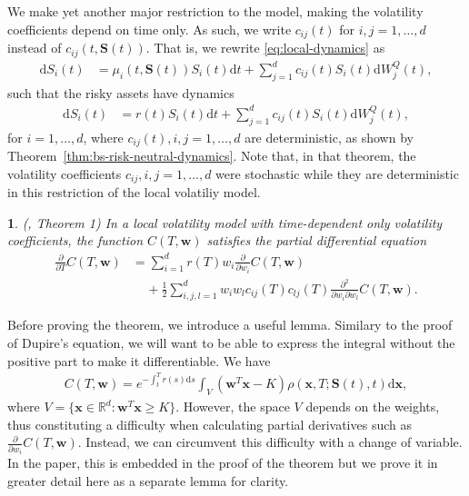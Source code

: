\documentclass[english]{article}
\numberwithin{equation}{section}
\numberwithin{figure}{section}
\theoremstyle{bolddescit}
\newtheorem{theorem}{\protect\theoremname}[section]
\theoremstyle{definition}
\theoremstyle{definition}
\theoremstyle{plain}
\theoremstyle{plain}
\theoremstyle{bolddesc}
\theoremstyle{plain}
\theoremstyle{remark}
\providecommand{\theoremname}{Theorem}
\begin{document}
We make yet another major restriction to the model, making the volatility coefficients depend on time only. As such, we write $c_{ij}(t)$ for $i,j=1,\ldots,d$ instead of $c_{ij}(t,\mathbf{S}(t))$. That is, we rewrite \eqref{eq:local-dynamics} as
\begin{align*}
  \mathrm{d}S_i(t) &= \mu_i(t, \mathbf{S}(t)) S_i(t) \mathrm{d}t + \sum_{j=1}^{d} c_{ij}(t) S_i(t) \mathrm{d}W^Q_j(t),
\end{align*}
such that the risky assets have dynamics
\begin{align*}
  \mathrm{d}S_i(t) &= r(t) S_i(t) \mathrm{d}t + \sum_{j=1}^{d} c_{ij}(t) S_i(t) \mathrm{d}W^Q_j(t),
\end{align*}
for $i=1,\ldots,d$, where $c_{ij}(t), i,j=1,\ldots,d$ are deterministic, as shown by Theorem~\ref{thm:bs-risk-neutral-dynamics}. Note that, in that theorem, the volatility coefficients $c_{ij}, i,j=1,\ldots,d$ were stochastic while they are deterministic in this restriction of the local volatiliy model.

\begin{theorem}\label{thm:generalisation}
  (\cite{pablo_amster_towards_2009}, Theorem 1)
  In a local volatility model with time-dependent only volatility coefficients, the function $C(T,\mathbf{w})$ satisfies the partial differential equation
  \begin{align*}
      \frac{\partial}{\partial T} C(T,\mathbf{w})
      &= \sum_{i=1}^{d} r(T) w_i \frac{\partial}{\partial w_i} C(T,\mathbf{w})\\
      &\ \ \ \ \ + \frac{1}{2} \sum_{i,j,l=1}^{d} w_i w_l c_{ij}(T) c_{lj}(T) \frac{\partial^2}{\partial w_i \partial w_l} C(T,\mathbf{w}).
  \end{align*}
\end{theorem}

Before proving the theorem, we introduce a useful lemma. Similary to the proof of Dupire's equation, we will want to be able to express the integral without the positive part to make it differentiable. We have
\begin{align}\label{eq:generalisation-int-over-V}
  C(T,\mathbf{w}) = e^{-\int_t^T r(s) \mathrm{d}s} \int_V (\mathbf{w}^T\mathbf{x} - K) \rho(\mathbf{x},T;\mathbf{S}(t),t) \mathrm{d}\mathbf{x},
\end{align}
where $V = \{ \mathbf{x} \in \mathbb{R}^d : \mathbf{w}^T \mathbf{x} \ge K \}$. However, the space $V$ depends on the weights, thus constituting a difficulty when calculating partial derivatives such as $\frac{\partial}{\partial w_i}C(T,\mathbf{w})$. Instead, we can circumvent this difficulty with a change of variable. In the paper, this is embedded in the proof of the theorem but we prove it in greater detail here as a separate lemma for clarity.
\end{document}
